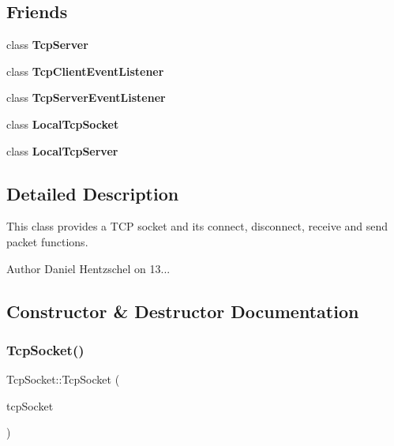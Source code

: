 \subsection*{Friends}
\begin{DoxyCompactItemize}
\item 
\mbox{\label{class_tcp_socket_a3ecf3132e8c4bf890c07853cfab7619c}} 
class {\bfseries Tcp\+Server}
\item 
\mbox{\label{class_tcp_socket_a2cb57636a27be761e0817237d9e5f938}} 
class {\bfseries Tcp\+Client\+Event\+Listener}
\item 
\mbox{\label{class_tcp_socket_afff21cc973310e3b55b9f25cd8d76bd0}} 
class {\bfseries Tcp\+Server\+Event\+Listener}
\item 
\mbox{\label{class_tcp_socket_a52dd93b253cbac4f0e6feee47d75c92d}} 
class {\bfseries Local\+Tcp\+Socket}
\item 
\mbox{\label{class_tcp_socket_a31f2ca6d48ea51cd511ab7d877ce0dac}} 
class {\bfseries Local\+Tcp\+Server}
\end{DoxyCompactItemize}


\subsection{Detailed Description}
This class provides a T\+CP socket and its connect, disconnect, receive and send packet functions. 

\begin{DoxyAuthor}{Author}
Daniel Hentzschel on 13... 
\end{DoxyAuthor}


\subsection{Constructor \& Destructor Documentation}
\mbox{\label{class_tcp_socket_aac5a96f2ac3a824fb7c52260a6a6c2bd}} 
\subsubsection{\texorpdfstring{TcpSocket()}{TcpSocket()}\hspace{0.1cm}{\footnotesize\ttfamily [1/2]}}
{\footnotesize\ttfamily Tcp\+Socket\+::\+Tcp\+Socket (\begin{DoxyParamCaption}\item[{const \mbox{\hyperlink{class_tcp_socket}{Tcp\+Socket}} \&}]{tcp\+Socket }\end{DoxyParamCaption})}



